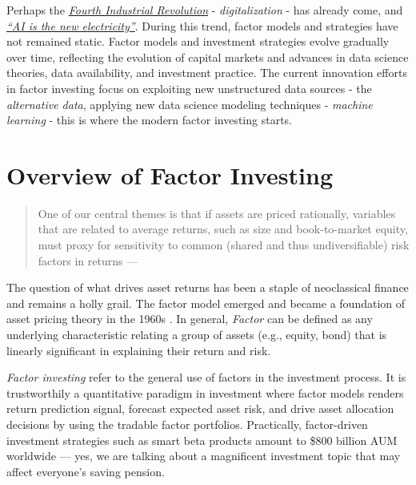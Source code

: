 \documentclass[
]{book}
\begin{document}
Perhaps the \emph{\href{https://www.weforum.org/agenda/2016/01/the-fourth-industrial-revolution-what-it-means-and-how-to-respond/}{Fourth Industrial Revolution}} - {\emph{digitalization}} - has already come, and \emph{\href{https://www.gsb.stanford.edu/insights/andrew-ng-why-ai-new-electricity}{``AI is the new electricity''}}. During this trend, factor models and strategies have not remained static. Factor models and investment strategies evolve gradually over time, reflecting the evolution of capital markets and advances in data science theories, data availability, and investment practice. The current innovation efforts in factor investing focus on exploiting new unstructured data sources - the {\emph{alternative data}}, applying new data science modeling techniques - {\emph{machine learning}} - this is where the modern factor investing starts.

\hypertarget{overview-of-factor-investing}{%
\section{Overview of Factor Investing}\label{overview-of-factor-investing}}

\begin{quote}
One of our central themes is that if assets are priced rationally, variables that are related to average returns, such as size and book-to-market equity, must proxy for sensitivity to common (shared and thus undiversifiable) risk factors in returns --- \citet{fama1993common}
\end{quote}

The question of what drives asset returns has been a staple of neoclassical finance and remains a holly grail. The factor model emerged and became a foundation of asset pricing theory in the 1960s \citetext{\citealp{lintner1969valuation}; \citealp{mossin1966equilibrium}; \citealp{sharpe1964capital}; \citealp[and][]{treynor1961toward}}. In general, {\emph{Factor}} can be defined as any underlying characteristic relating a group of assets (e.g., equity, bond) that is linearly significant in explaining their return and risk.

{\emph{Factor investing}} refer to the general use of factors in the investment process. It is trustworthily a quantitative paradigm in investment where factor models renders return prediction signal, forecast expected asset risk, and drive asset allocation decisions by using the tradable factor portfolios. Practically, factor-driven investment strategies such as smart beta products amount to \$800 billion AUM worldwide \citep{johnson2018etf} --- yes, we are talking about a magnificent investment topic that may affect everyone's saving pension.
\end{document}
